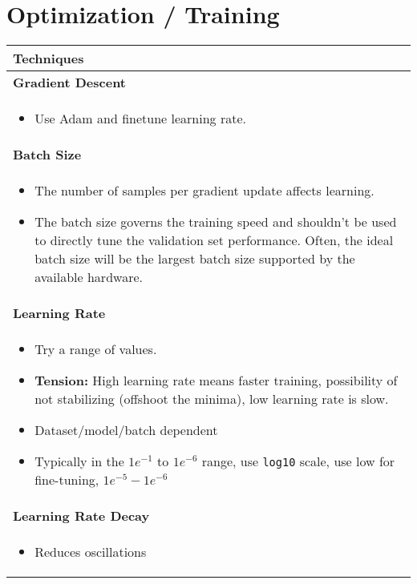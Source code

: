 \section{Optimization / Training}
\begin{summary}
    \begin{center}
        \begin{tabular}{l}
        \toprule
        \textbf{Techniques} \\
        \midrule
        \textbf{Gradient Descent} \\
        \multicolumn{1}{p{\linewidth}}{
        \begin{itemize}
            \item Use Adam and finetune learning rate.
        \end{itemize}} \\
        \midrule
        \textbf{Batch Size} \\
        \multicolumn{1}{p{\linewidth}}{
        \begin{itemize}
            \item The number of samples per gradient update affects learning.
            \item The batch size governs the training speed and shouldn't be used to directly tune the validation set performance. Often, the ideal batch size will be the largest batch size supported by the available hardware.
        \end{itemize}} \\
        \midrule
        \textbf{Learning Rate} \\
        \multicolumn{1}{p{\linewidth}}{
        \begin{itemize}
            \item Try a range of values. 
            \item \textbf{Tension:} High learning rate means faster training, possibility of not stabilizing (offshoot the minima), low learning rate is slow.  
            \item Dataset/model/batch dependent
            \item Typically in the $1e^{-1}$ to $1e^{-6}$ range, use \texttt{log10} scale, use low for fine-tuning, $1e^{-5} - 1e^{-6}$
        \end{itemize}} \\
        \midrule
        \textbf{Learning Rate Decay} \\
        \multicolumn{1}{p{\linewidth}}{
        \begin{itemize}
            \item Reduces oscillations

\end{itemize}}
\end{tabular}
\end{center}
\end{summary}
